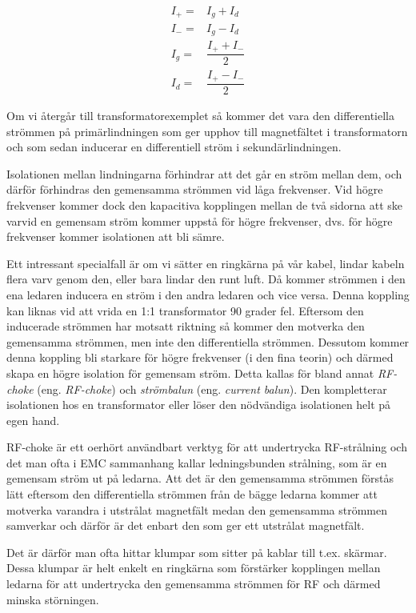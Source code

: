 \begin{eqnarray}
I_+ = & I_g + I_d\\
I_- = & I_g - I_d\\
I_g = & \dfrac{I_+ + I_-}{2}\\
I_d = & \dfrac{I_+ - I_-}{2}
\end{eqnarray}

Om vi återgår till transformatorexemplet så kommer det vara den differentiella
strömmen på primärlindningen som ger upphov till magnetfältet i transformatorn
och som sedan inducerar en differentiell ström i sekundärlindningen.

Isolationen mellan lindningarna förhindrar att det går en ström mellan dem,
och därför förhindras den gemensamma strömmen vid låga frekvenser.
Vid högre frekvenser kommer dock den kapacitiva kopplingen mellan de två
sidorna att ske varvid en gemensam ström kommer uppstå för högre frekvenser,
dvs. för högre frekvenser kommer isolationen att bli sämre.

Ett intressant specialfall är om vi sätter en ringkärna på vår kabel, lindar
kabeln flera varv genom den, eller bara lindar den runt luft.
Då kommer strömmen i den ena ledaren inducera en ström i den andra ledaren och
vice versa.
Denna koppling kan liknas vid att vrida en 1:1 transformator 90 grader fel.
Eftersom den inducerade strömmen har motsatt riktning så kommer den motverka
den gemensamma strömmen, men inte den differentiella strömmen. Dessutom kommer
denna koppling bli starkare för högre frekvenser (i den fina teorin) och
därmed skapa en högre isolation för gemensam ström.
Detta kallas för bland annat \emph{RF-choke} (eng. \emph{RF-choke}) och
\emph{strömbalun} (eng. \emph{current balun}).
Den kompletterar isolationen hos en transformator eller löser den nödvändiga
isolationen helt på egen hand.

RF-choke är ett oerhört användbart verktyg för att undertrycka RF-strålning
och det man ofta i EMC sammanhang kallar ledningsbunden strålning, som är en
gemensam ström ut på ledarna.
Att det är den gemensamma strömmen förstås lätt eftersom den differentiella
strömmen från de bägge ledarna kommer att motverka varandra i utstrålat
magnetfält medan den gemensamma strömmen samverkar och därför är det enbart
den som ger ett utstrålat magnetfält.

Det är därför man ofta hittar klumpar som sitter på kablar till t.ex. skärmar.
Dessa klumpar är helt enkelt en ringkärna som förstärker kopplingen mellan
ledarna för att undertrycka den gemensamma strömmen för RF och därmed minska
störningen.

